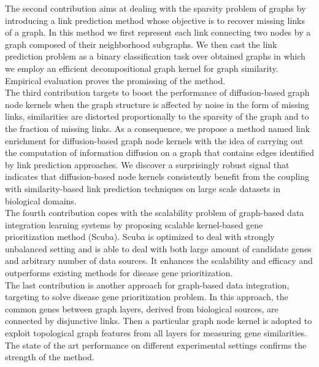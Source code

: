 The second contribution aims at dealing with the sparsity problem of graphs by introducing a link prediction method whose objective is to recover missing links of a graph. In this method we first represent each link connecting two nodes by a graph composed of their neighborhood subgraphs. We then cast the link prediction problem as a binary classification task over obtained graphs in which we employ an efficient decompositional graph kernel for graph similarity. Empirical evaluation proves the promissing of the method.\\

The third contribution targets to boost the performance of diffusion-based graph node kernels when the graph structure is affected by noise in the form of missing links, similarities are distorted proportionally to the sparsity of
the graph and to the fraction of missing links. As a consequence, we propose a method named link enrichment for diffusion-based graph node kernels with the idea of carrying out the computation of information diffusion on a graph that contains edges identified by link prediction approaches. We discover a surprisingly robust signal that indicates that diffusion-based node kernels consistently benefit from the coupling with similarity-based link prediction techniques on large scale datasets in biological domains.\\

The fourth contribution copes with the scalability problem of graph-based data integration learning systems by proposing scalable kernel-based gene prioritization method (Scuba). Scuba is optimized to deal with strongly unbalanced setting and is able to deal with both large amount of candidate genes and arbitrary number of data sources. It enhances the scalability and efficacy and outperforms existing methods for disease gene prioritization.\\

The last contribution is another approach for graph-based data integration, targeting to solve disease gene prioritization problem. In this approach, the common genes between graph layers, derived from biological sources, are connected by disjunctive links. Then a particular graph node kernel is adopted to exploit topological graph features from all layers for measuring gene similarities. The state of the art performance on different experimental settings confirms the strength of the method. 
